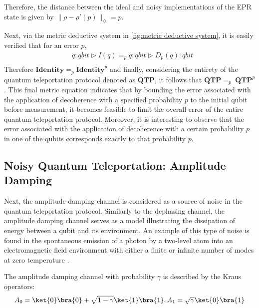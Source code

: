 Therefore, the distance between the ideal and noisy implementations of the EPR state is given by $\lVert \rho-\rho'(p) \rVert_{\diamondsuit} = p$.

Next, via the metric deductive system in \autoref{fig:metric deductive system}, it is easily verified that for an error $p$,
\begin{equation}
\begin{split}
    &q: \textit{qbit}  \triangleright  I (q) =_{p} q: \textit{qbit} \triangleright D_{p} (q)  : \textit{qbit} \\    
\end{split}
\end{equation}
Therefore $\textbf{Identity} =_{p} \textbf{Identity}^{p}$ and finally, considering the entirety of the quantum teleportation protocol denoted as $\textbf{QTP}$, it follows that $\textbf{QTP} =_{p} \hspace{3pt}\textbf{QTP}^{p}$. This final metric equation indicates that by bounding the error associated with the application of decoherence with a specified probability $p$ to the initial qubit before measurement, it becomes feasible to limit the overall error of the entire quantum teleportation protocol. Moreover, it is interesting to observe that the error associated with the application of decoherence with a certain probability $p$ in one of the qubits corresponds exactly to that probability $p$.

\subsection{Noisy Quantum Teleportation: Amplitude Damping}
Next, the amplitude-damping channel is considered as a source of noise in the quantum teleportation protocol. Similarly to the dephasing channel, the amplitude damping channel serves as a model illustrating the dissipation of energy between a qubit and its environment. An example of this type of noise is found in the spontaneous emission of a photon by a two-level atom into an electromagnetic field environment with either a finite or infinite number of modes at zero temperature \cite{salles2008experimental, Wang_2011}.


The amplitude damping channel with probability $\gamma$ is described by the Kraus operators:
\begin{equation}
     A_{0}= \ket{0} \bra{0} + \sqrt{1-\gamma} \ket{1} \bra{1} ,  A_{1}= \sqrt{\gamma} \ket{0} \bra{1}
\end{equation}

